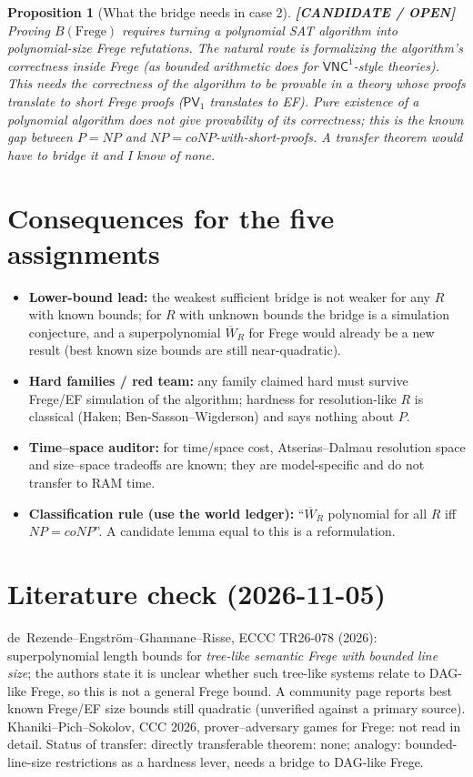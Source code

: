 \documentclass[11pt]{article}
\newtheorem{proposition}[theorem]{Proposition}
\newcommand{\status}[1]{\textbf{[#1]}}
\begin{document}
\begin{proposition}[What the bridge needs in case 2] \status{CANDIDATE / OPEN}
Proving $B(\mathrm{Frege})$ requires turning a polynomial SAT algorithm into polynomial-size Frege refutations. The natural route is formalizing the algorithm's correctness inside Frege (as bounded arithmetic does for $\mathsf{VNC}^1$-style theories). This needs the correctness of the algorithm to be provable in a theory whose proofs translate to short Frege proofs ($\mathsf{PV}_1$ translates to EF). Pure existence of a polynomial algorithm does \emph{not} give provability of its correctness; this is the known gap between $P=NP$ and $NP=coNP$-with-short-proofs. A transfer theorem would have to bridge it and I know of none.
\end{proposition}

\section{Consequences for the five assignments}
\begin{itemize}
\item \textbf{Lower-bound lead:} the weakest sufficient bridge is not weaker for any $R$ with known bounds; for $R$ with unknown bounds the bridge is a simulation conjecture, and a superpolynomial $\overline W_R$ for Frege would already be a new result (best known size bounds are still near-quadratic).
\item \textbf{Hard families / red team:} any family claimed hard must survive Frege/EF simulation of the algorithm; hardness for resolution-like $R$ is classical (Haken; Ben-Sasson--Wigderson) and says nothing about $P$.
\item \textbf{Time--space auditor:} for time/space cost, Atserias--Dalmau resolution space and size--space tradeoffs are known; they are model-specific and do not transfer to RAM time.
\item \textbf{Classification rule (use the world ledger):} ``$\overline W_R$ polynomial for all $R$ iff $NP=coNP$''. A candidate lemma equal to this is a reformulation.
\end{itemize}

\section{Literature check (2026-11-05)}
de~Rezende--Engstr\"om--Ghannane--Risse, ECCC TR26-078 (2026): superpolynomial length bounds for \emph{tree-like semantic Frege with bounded line size}; the authors state it is unclear whether such tree-like systems relate to DAG-like Frege, so this is not a general Frege bound. A community page reports best known Frege/EF size bounds still quadratic (unverified against a primary source). Khaniki--Pich--Sokolov, CCC 2026, prover--adversary games for Frege: not read in detail. Status of transfer: directly transferable theorem: none; analogy: bounded-line-size restrictions as a hardness lever, needs a bridge to DAG-like Frege.
\end{document}
